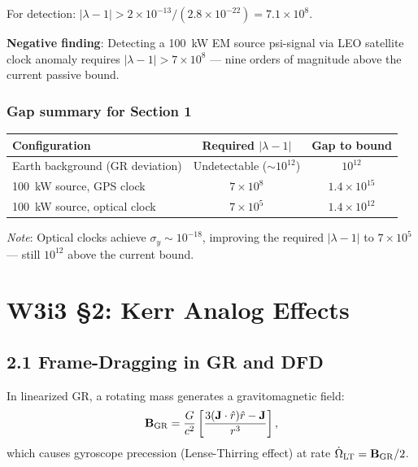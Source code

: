 \documentclass[11pt,twocolumn]{article}
\newcommand{\lam}{\lambda}
\begin{document}
For detection: $|\lam-1| > 2\times10^{-13}/(2.8\times10^{-22})
= 7.1\times10^{8}$.

\textbf{Negative finding}: Detecting a 100~kW EM source psi-signal via
LEO satellite clock anomaly requires $|\lam-1| > 7\times10^8$ --- nine
orders of magnitude above the current passive bound.

\subsubsection*{Gap summary for Section 1}

\begin{center}
\begin{tabular}{@{}lcc@{}}
\toprule
\textbf{Configuration} & Required $|\lam-1|$ & Gap to bound \\
\midrule
Earth background (GR deviation) & Undetectable ($\sim10^{12}$) & $10^{12}$ \\
100~kW source, GPS clock & $7\times10^8$ & $1.4\times10^{15}$ \\
100~kW source, optical clock & $7\times10^5$ & $1.4\times10^{12}$ \\
\bottomrule
\end{tabular}
\end{center}

\textit{Note}: Optical clocks achieve $\sigma_y \sim 10^{-18}$, improving
the required $|\lam-1|$ to $7\times10^5$ --- still $10^{12}$ above the
current bound.

\section*{W3i3 \S2: Kerr Analog Effects}
\label{sec:kerr}

\subsection*{2.1 Frame-Dragging in GR and DFD}

In linearized GR, a rotating mass generates a gravitomagnetic field:
\begin{equation}
\mathbf{B}_{\rm GR} = \frac{G}{c^2}\left[
  \frac{3(\mathbf{J}\cdot\hat r)\hat r - \mathbf{J}}{r^3}
\right],
\label{eq:B_GR}
\end{equation}
which causes gyroscope precession (Lense-Thirring effect) at rate
$\dot\Omega_{\rm LT} = \mathbf{B}_{\rm GR}/2$.
\end{document}
